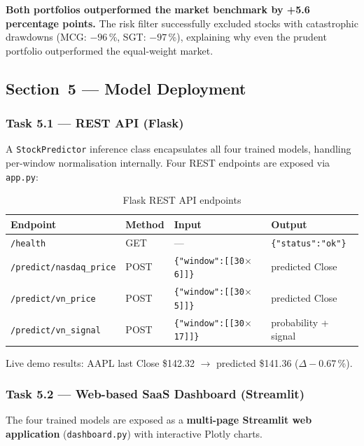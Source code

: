 \documentclass[12pt,a4paper]{article}
\begin{document}
\textbf{Both portfolios outperformed the market benchmark by +5.6 percentage
points.} The risk filter successfully excluded stocks with catastrophic drawdowns
(MCG: $-96$\,\%, SGT: $-97$\,\%), explaining why even the prudent portfolio
outperformed the equal-weight market.

\subsection{Section~5 --- Model Deployment}

\subsubsection{Task 5.1 --- REST API (Flask)}

A \texttt{StockPredictor} inference class encapsulates all four trained models,
handling per-window normalisation internally. Four REST endpoints are exposed
via \texttt{app.py}:

\begin{table}[H]
\centering
\caption{Flask REST API endpoints}
\begin{tabularx}{\linewidth}{llXl}
\toprule
\textbf{Endpoint} & \textbf{Method} & \textbf{Input} & \textbf{Output} \\
\midrule
\texttt{/health}               & GET  & ---                              & \texttt{\{"status":"ok"\}} \\
\texttt{/predict/nasdaq\_price} & POST & \texttt{\{"window":[[30$\times$6]]\}} & predicted Close \\
\texttt{/predict/vn\_price}     & POST & \texttt{\{"window":[[30$\times$5]]\}} & predicted Close \\
\texttt{/predict/vn\_signal}    & POST & \texttt{\{"window":[[30$\times$17]]\}} & probability + signal \\
\bottomrule
\end{tabularx}
\end{table}

Live demo results: AAPL last Close \$142.32 $\to$ predicted \$141.36
($\Delta -0.67$\,\%).

\subsubsection{Task 5.2 --- Web-based SaaS Dashboard (Streamlit)}

The four trained models are exposed as a \textbf{multi-page Streamlit web
application} (\texttt{dashboard.py}) with interactive Plotly charts.
\end{document}
